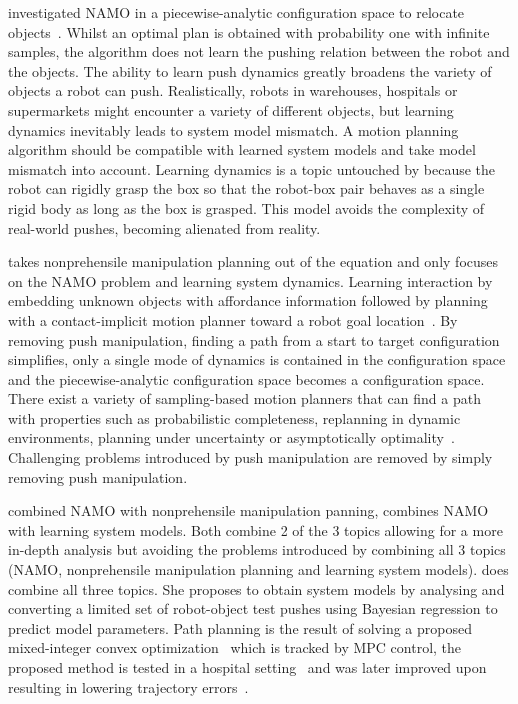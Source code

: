 \citeauthor{vega-brown_asymptotically_2020} investigated \ac{NAMO} in a piecewise-analytic configuration space to relocate objects~\cite{vega-brown_asymptotically_2020}. Whilst an optimal plan is obtained with probability one with infinite samples, the algorithm does not learn the pushing relation between the robot and the objects. The ability to learn push dynamics greatly broadens the variety of objects a robot can push. Realistically, robots in warehouses, hospitals or supermarkets might encounter a variety of different objects, but learning dynamics inevitably leads to system model mismatch. A motion planning algorithm should be compatible with learned system models and take model mismatch into account. Learning dynamics is a topic untouched by \citeauthor{vega-brown_asymptotically_2020} because the robot can rigidly grasp the box so that the robot-box pair behaves as a single rigid body as long as the box is grasped. This model avoids the complexity of real-world pushes, becoming alienated from reality.\bs

\citeauthor{wang_affordancebased_2020} takes nonprehensile manipulation planning out of the equation and only focuses on the \ac{NAMO} problem and learning system dynamics. Learning interaction by embedding unknown objects with affordance information followed by planning with a contact-implicit motion planner toward a robot goal location~\cite{wang_affordancebased_2020}. By removing push manipulation, finding a path from a start to target configuration simplifies, only a single mode of dynamics is contained in the configuration space and the piecewise-analytic configuration space becomes a configuration space. There exist a variety of sampling-based motion planners that can find a path with properties such as probabilistic completeness, replanning in dynamic environments, planning under uncertainty or asymptotically optimality~\cite{karaman_samplingbased_2011,elbanhawi_samplingbased_2014}. Challenging problems introduced by push manipulation are removed by simply removing push manipulation.\bs

\citeauthor{vega-brown_asymptotically_2020} combined \ac{NAMO} with nonprehensile manipulation panning, \citeauthor{wang_affordancebased_2020} combines \ac{NAMO} with learning system models. Both combine 2 of the 3 topics allowing for a more in-depth analysis but avoiding the problems introduced by combining all 3 topics (\ac{NAMO}, nonprehensile manipulation planning and learning system models). \citeauthor{sabbaghnovin_model_2021} does combine all three topics. She proposes to obtain system models by analysing and converting a limited set of robot-object test pushes using Bayesian regression to predict model parameters. Path planning is the result of solving a proposed mixed-integer convex optimization~\cite{sabbaghnovin_optimal_2016} which is tracked by \ac{MPC} control, the proposed method is tested in a hospital setting~\cite{novin_dynamic_2018} and was later improved upon resulting in lowering trajectory errors~\cite{sabbaghnovin_model_2021}.\bs

